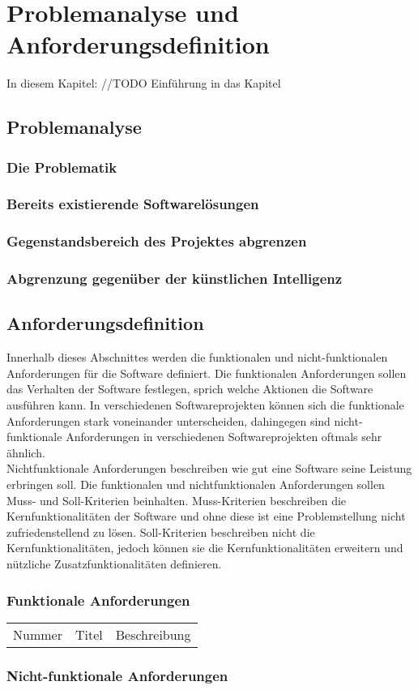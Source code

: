 \chapter{Problemanalyse und Anforderungsdefinition}
\label{cha:pua}

In diesem Kapitel: //TODO Einführung in das Kapitel

\section{Problemanalyse}

\subsection{Die Problematik}

\subsection{Bereits existierende Softwarelösungen}

\subsection{Gegenstandsbereich des Projektes abgrenzen}

\subsection{Abgrenzung gegenüber der künstlichen Intelligenz}

\section{Anforderungsdefinition}
Innerhalb dieses Abschnittes werden die funktionalen und nicht-funktionalen Anforderungen für die Software definiert. Die funktionalen Anforderungen sollen das Verhalten der Software festlegen, sprich welche Aktionen die Software ausführen kann. In verschiedenen Softwareprojekten können sich die funktionale Anforderungen stark voneinander unterscheiden, dahingegen sind nicht-funktionale Anforderungen in verschiedenen Softwareprojekten oftmals sehr ähnlich.\\ 
Nichtfunktionale Anforderungen beschreiben wie gut eine Software seine Leistung erbringen soll.
Die funktionalen und nichtfunktionalen Anforderungen sollen Muss- und Soll-Kriterien beinhalten. Muss-Kriterien beschreiben die Kernfunktionalitäten der Software und ohne diese ist eine Problemstellung nicht zufriedenstellend zu lösen. Soll-Kriterien beschreiben nicht die Kernfunktionalitäten, jedoch können sie die Kernfunktionalitäten erweitern und nützliche Zusatzfunktionalitäten definieren.

\subsection{Funktionale Anforderungen}

\begin{tabular}{lcr}
Nummer & Titel & Beschreibung
\end{tabular}

\subsection{Nicht-funktionale Anforderungen}


